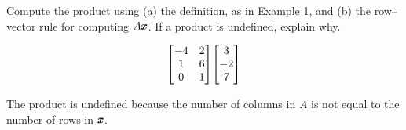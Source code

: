 \documentclass{../mathhomework}
\newenvironment{Mat}{\begin{bmatrix}}{\end{bmatrix}}
\begin{document}
\maketitle

\pagebreak


\begin{problem}[1.4\#1]
    Compute the product using (a) the definition, as in Example 1, and (b) the row–vector rule for computing $A\pmb{x}$. If a product is undefined, explain why.

    \begin{equation*}
        \begin{Mat}
            -4 & 2 \\
            1 & 6 \\
            0 & 1
        \end{Mat}
        \begin{Mat}
            3 \\ -2 \\ 7
        \end{Mat}
    \end{equation*}

    \begin{solution}
        The product is undefined because the number of columns in $A$ is not equal to the number of rows in $\pmb{x}$.
    \end{solution}
\end{problem}
\end{document}
